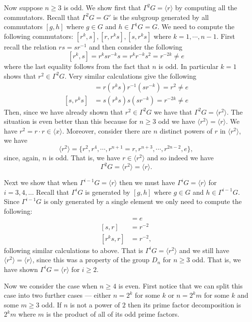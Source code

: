 \documentclass[12pt,letterpaper,boxed]{hmcpset}
\newcommand{\inv}{^{-1}}
\newcommand{\anglee}[1]{\langle #1 \rangle}
\begin{document}
\begin{solution}
Now suppose $n \geq 3$ is odd. We show first that $\Gamma^2 G =
\langle r \rangle$ by computing all the commutators. Recall that
$\Gamma^2 G = G'$ is the subgroup generated by all commutators $[g,h]$
where $g \in G$ and $h \in \Gamma^1 G = G$. We need to compute the
following commutators: $[r^k,s], [r,r^ks], [s,r^ks]$ where $k = 1,
\cdots, n-1$. First recall the relation $rs = s r\inv$ and then
consider the following \[
	[r^k, s] = r^k s r^{-k} s = r^k r^{-k} s^2 = r^{-2k} \neq e
\]
where the last equality follows from the fact that $n$ is odd.
In particular $k=1$ shows that $r^2 \in \Gamma^2 G$. 
Very similar calculations give the following
\begin{align*}
	[r, r^ks] &= r (r^k s) r\inv (s r^{-k}) = r^2 \neq e \\
	[s, r^ks] &= s(r^k s) s (s r^{-k}) = r^{-2k} \neq e
\end{align*}
Then, since we have already shown that $r^2 \in \Gamma^2 G$ we have
that $\Gamma^2 G = \langle r^2 \rangle$. The situation is even better
than this because for $n \geq 3$ odd we have $\langle r^2 \rangle =
\langle r \rangle$. We have $r^2 = r \cdot r \in \langle x \rangle$.
Moreover, consider there are $n$ distinct powers of $r$ in $\langle
r^2 \rangle$, we have \[
\langle r^2 \rangle = \{r^2, r^4, \cdots, r^{n + 1} = r, r^{n+3}, \cdots,
r^{2n-2}, e\},
\]
since, again, $n$ is odd. That is, we have $r \in \langle r^2 \rangle$
and so indeed we have \[
	\Gamma^2 G = \langle r^2 \rangle = \langle r \rangle.
\]

Next we show that when $\Gamma^{i-1} G = \langle r \rangle$  then we
must have $\Gamma^i G = \anglee r$ for $i = 3, 4, \dots$ 
Recall that $\Gamma^i G$ is generated by $[g,h]$ where $g \in G$ and
$h \in \Gamma^{i-1}G$. Since $\Gamma^{i-1}G$ is only generated by a
single element we only need to compute the following:
\begin{align*}
	[r^k, r] &= e\\
	[s, r] &= r^{-2}\\
	[r^ks, r] &= r^{-2},
\end{align*}
following similar calculations to above. That is $\Gamma^i G = \anglee
{r^2}$ and we still have $\anglee{r^2} = \anglee r$, since this was a
property of the group $D_n$ for $n \geq 3$ odd.
That is, we have shown $\Gamma^i G = \anglee r$ for $i \geq 2$. 

Now we consider the case when $n \geq 4$ is even. First notice that we
can split this case into two further cases --- either $n = 2^k$ for
some $k$ or $n = 2^km$ for some $k$ and some $m \geq 3$ odd. If $n$ is
not a power of $2$ then its prime factor decomposition is $2^k m$
where $m$ is the product of all of its odd prime factors.


\end{solution}
\end{document}
